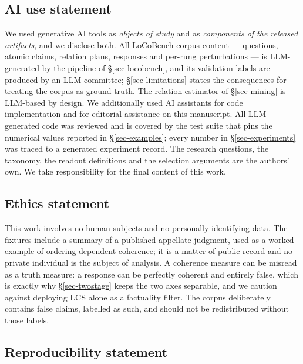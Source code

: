 \documentclass{article} %
\newcommand{\LCS}{\mathrm{LCS}}
\begin{document}
\subsection*{AI use statement}

We used generative AI tools as \emph{objects of study} and as \emph{components of the
released artifacts}, and we disclose both. All LoCoBench corpus content --- questions, atomic
claims, relation plans, responses and per-rung perturbations --- is LLM-generated by the
pipeline of \S\ref{sec-locobench}, and its validation labels are produced by an LLM committee;
\S\ref{sec-limitations} states the consequences for treating the corpus as ground truth. The
relation estimator of \S\ref{sec-mining} is LLM-based by design. We additionally used
AI assistants for code implementation and for editorial assistance on this manuscript. All
LLM-generated code was reviewed and is covered by the test suite that pins the numerical
values reported in \S\ref{sec-examples}; every number in \S\ref{sec-experiments} was traced to
a generated experiment record. The research questions, the taxonomy, the readout definitions
and the selection arguments are the authors' own. We take responsibility for the final content
of this work.

\subsection*{Ethics statement}

This work involves no human subjects and no personally identifying data. The fixtures include
a summary of a published appellate judgment, used as a worked example of ordering-dependent
coherence; it is a matter of public record and no private individual is the subject of
analysis. A coherence measure can be misread as a truth measure: a response can be perfectly
coherent and entirely false, which is exactly why \S\ref{sec-twostage} keeps the two axes
separable, and we caution against deploying $\LCS$ alone as a factuality filter. The corpus
deliberately contains false claims, labelled as such, and should not be redistributed without
those labels.

\subsection*{Reproducibility statement}
\end{document}
